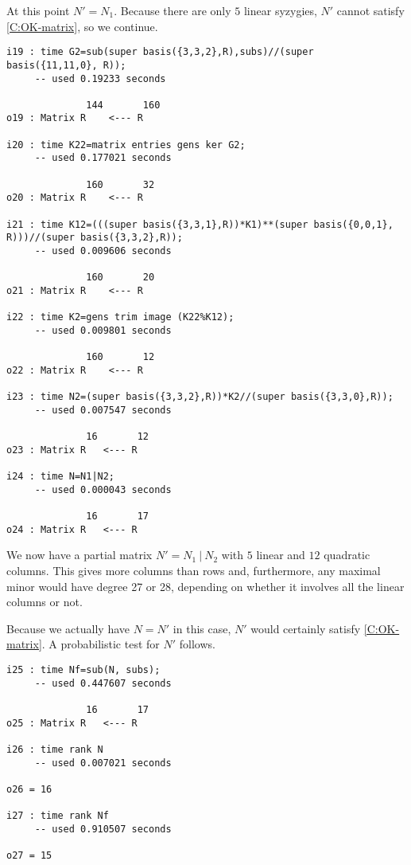 \documentclass[fleqn,reqno]{amsart}
\numberwithin{first}{chapter}
\begin{document}
At this point $N'=N_1$.
Because there are only $5$ linear syzygies, $N'$ cannot satisfy \ref{C:OK-matrix},
so we continue.

\begin{verbatim}
i19 : time G2=sub(super basis({3,3,2},R),subs)//(super basis({11,11,0}, R));
     -- used 0.19233 seconds

              144       160
o19 : Matrix R    <--- R

i20 : time K22=matrix entries gens ker G2;
     -- used 0.177021 seconds

              160       32
o20 : Matrix R    <--- R

i21 : time K12=(((super basis({3,3,1},R))*K1)**(super basis({0,0,1}, R)))//(super basis({3,3,2},R));
     -- used 0.009606 seconds

              160       20
o21 : Matrix R    <--- R

i22 : time K2=gens trim image (K22%K12);
     -- used 0.009801 seconds

              160       12
o22 : Matrix R    <--- R

i23 : time N2=(super basis({3,3,2},R))*K2//(super basis({3,3,0},R));
     -- used 0.007547 seconds

              16       12
o23 : Matrix R   <--- R

i24 : time N=N1|N2;
     -- used 0.000043 seconds

              16       17
o24 : Matrix R   <--- R

\end{verbatim}

We now have a partial matrix $N'=N_1~|~N_2$ with $5$ linear and $12$ quadratic columns.
This gives more columns than rows and, furthermore, any maximal minor would have degree
27 or 28, depending on whether it involves all the linear columns or not.

Because we actually have $N=N'$ in this case, $N'$ would certainly satisfy \ref{C:OK-matrix}.
A probabilistic test for $N'$ follows.

\begin{verbatim}
i25 : time Nf=sub(N, subs);
     -- used 0.447607 seconds

              16       17
o25 : Matrix R   <--- R

i26 : time rank N
     -- used 0.007021 seconds

o26 = 16

i27 : time rank Nf
     -- used 0.910507 seconds

o27 = 15

\end{verbatim}
\end{document}
